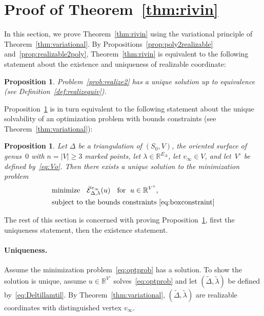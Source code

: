 \documentclass[a4paper, 11pt]{article}
\newcommand{\R}{\mathbb{R}}
\newcommand{\Deltil}{\widetilde{\Delta}}
\newcommand{\lamtil}{\tilde{\lambda}}
\newcommand{\Ecal}{\mathcal{E}}
\newcommand{\Ecalbar}{\bar{\Ecal}}
\newcommand{\Vo}{V^{\circ}}
\theoremstyle{plain}
\newtheorem{proposition}[theorem]{Proposition}
\theoremstyle{definition}
\begin{document}
\section{Proof of Theorem~\ref{thm:rivin}}
\label{sec:proof}

In this section, we prove Theorem~\ref{thm:rivin} using the
variational principle of Theorem~\ref{thm:variational}. By
Propositions~\ref{prop:poly2realizable}
and~\ref{prop:realizable2poly}, Theorem~\ref{thm:rivin} is equivalent
to the following statement about the existence and uniqueness of
realizable coordinate:

\begin{proposition}
  \label{prop:realizable}
  Problem~\ref{prob:realize2} has a unique solution up to equivalence
  (see Definition~\ref{def:realizequiv}). 
\end{proposition}

Proposition~\ref{prop:realizable} is in turn equivalent to the
following statement about the unique solvability of an optimization
problem with bounds constraints (see Theorem~\ref{thm:variational}):

\begin{proposition}
  \label{prop:minimum}
  Let $\Delta$ be a triangulation of $(S_{0},V)$, the oriented surface
  of genus~$0$ with $n=|V|\geq 3$ marked points, let
  $\lambda\in\R^{E_{\Delta}}$, let $v_{\infty}\in V$, and let~$\Vo$ be
  defined by~\eqref{eq:Vo}. Then there exists a unique solution to the
  minimization problem
  \begin{equation}
    \label{eq:optprob}
    \begin{aligned}
      &\text{minimize\ \;
          $\Ecalbar^{v_{\infty}}_{\Delta,\lambda}(u)$\ \; for\ \;$u\in\R^{\Vo}$,}\\
      &\text{subject to the bounds constraints~\eqref{eq:boxconstraint}}
    \end{aligned}
  \end{equation}
\end{proposition}

The rest of this section is concerned with proving
Proposition~\ref{prop:minimum}, first the uniqueness statement, then
the existence statement. 

\paragraph{Uniqueness.} Assume the minimization
problem~\eqref{eq:optprob} has a solution. To show the solution is
unique, assume $u\in\R^{\Vo}$ solves~\eqref{eq:optprob} and let
$(\Deltil,\lamtil)$ be defined by~\eqref{eq:Deltillamtil}. By
Theorem~\ref{thm:variational}, $(\Deltil,\lamtil)$ are realizable
coordinates with distinguished vertex $v_{\infty}$. 
\end{document}
